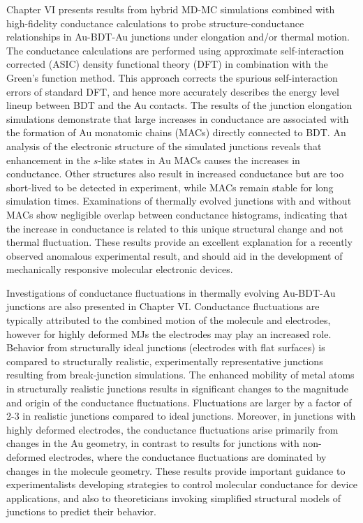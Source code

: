 \documentclass[10pt]{report}  %
\begin{document}
Chapter VI presents results from hybrid MD-MC simulations combined with high-fidelity conductance calculations to probe structure-conductance relationships in Au-BDT-Au junctions under elongation and/or thermal motion.\cite{French-macs:2013} The conductance calculations are performed using approximate self-interaction corrected (ASIC)\cite{Pemmaraju:2007}  density functional theory (DFT)  in combination with the Green's function method. This approach corrects the spurious self-interaction errors of standard DFT, and hence more accurately describes the energy level lineup between BDT and the Au contacts. \cite{Toher:2007,Toher:2008,Pontes:2011} The results of the junction elongation simulations demonstrate that large increases in conductance are associated with the formation of Au monatomic chains (MACs) directly connected to BDT. An analysis of the electronic structure of the simulated junctions reveals that enhancement in the $s$-like states in Au MACs causes the increases in conductance. Other structures also result in increased conductance but are too short-lived to be detected in experiment, while MACs remain stable for long simulation times. Examinations of thermally evolved junctions with and without MACs show negligible overlap between conductance histograms, indicating that the increase in conductance is related to this unique structural change and not thermal fluctuation. These results provide an excellent explanation for a recently observed anomalous experimental result,\cite{Bruot:2012} and should aid in the development of mechanically responsive molecular electronic devices. 

Investigations of conductance fluctuations in thermally evolving Au-BDT-Au junctions are also presented in Chapter VI.\cite{French-fluctuations:2013} Conductance fluctuations are typically attributed to the combined motion of the molecule and electrodes,\cite{Andrews:2008,Kim:2010} however for highly deformed MJs the electrodes may play an increased role. Behavior from structurally ideal junctions (electrodes with flat surfaces) is compared to structurally realistic, experimentally representative junctions resulting from break-junction simulations. The enhanced mobility of metal atoms in structurally realistic junctions results in significant changes to the magnitude and origin of the conductance fluctuations. Fluctuations are larger by a factor of 2-3 in realistic junctions compared to ideal junctions. Moreover, in junctions with highly deformed electrodes, the conductance fluctuations arise primarily from changes in the Au geometry, in contrast to results for junctions with non-deformed electrodes, where the conductance fluctuations are dominated by changes in the molecule geometry. These results provide important guidance to experimentalists developing strategies to control molecular conductance for device applications, and also to theoreticians invoking simplified structural models of junctions to predict their behavior.
\end{document}

